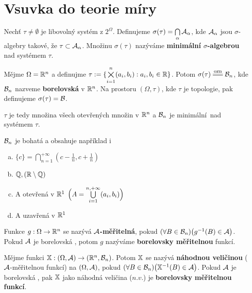 \chapter{Vsuvka do teorie míry}
\begin{define}
	Nechť $\tau\neq\emptyset $ je libovolný systém z $ 2^\Omega$. Definujeme $\sigma (\tau)= \bigcap\limits_{\alpha}\mathcal{A}_\alpha $, kde $\mathcal{A}_\alpha$ jsou $\sigma$-algebry takové, že $\tau \subset \mathcal{A}_\alpha$. Množinu $\sigma(\tau)$ nazýváme \textbf{minimální $\sigma$-algebrou} nad systémem $\tau$.
\end{define}
\begin{define}
	Mějme $\Omega=\mathbb{R}^n$ a definujme $\tau:=\{\bigtimes\limits_{i=1}^n(a_i,b_i):a_i,b_i\in\mathbb{R}\}$. Potom $\sigma(\tau)\equal{\text{ozn}}\Bb_n$, kde $\mathcal{B}_n$ nazveme \textbf{borelovská \salg} v $\mathbb{R}^n$. 
Na prostoru $(\Omega,\tau)$, kde $\tau$ je topologie, pak definujeme $\sigma(\tau)=\mathcal{B}$.
\end{define}
\begin{remark}
	 $\tau$ je tedy množina všech otevřených množin v $\mathbb{R}^n$ a $\mathcal{B}_n$ je minimální\newline \salg~nad systémem  $\tau$. 
\end{remark}
\begin{example}
	$\mathcal{B}_n$ je bohatá a obsahuje například i
	\begin{enumerate}[a)]
		\item $\{c\}=\bigcap\limits_{n=1}^{+\infty} (c-\frac{1}{n},c+\frac{1}{n}) $
		\item $\mathbb{Q}, (\mathbb{R}\setminus\mathbb{Q})$
		\item A otevřená v $\mathbb{R}^1$ $\Bigl(A=\bigcup\limits_{i=1}^{n,+\infty}(a_i,b_i)\Bigr)$
		\item A uzavřená v $\mathbb{R}^1$
	\end{enumerate}
\end{example}
\begin{define}
	Funkce $g:\Omega\to \mathbb{R}^n$ se nazývá \textbf{$\mathcal{A}$-měřitelná}, pokud $(\forall B \in \mathcal{B}_n)\bigl(g^{-1}(B) \in \mathcal{A}\bigr)$. Pokud $\mathcal{A}$ je borelovská \salg, potom $g$ nazýváme \textbf{borelovsky měřitelnou} funkcí.
\end{define}
\begin{define}
	Mějme funkci $\mathbb{X}:(\Omega,\mathcal{A})\to (\mathbb{R}^n,\mathcal{B}_n)$. Potom $\mathbb{X}$ se nazývá \textbf{náhodnou veličinou} ($\mathcal{A}$-měřitelnou funkcí) na $(\Omega,\mathcal{A})$, pokud $(\forall B \in \mathcal{B}_n)\bigl(\mathbb{X}^{-1}(B)\in \mathcal{A}\bigr)$. \newline
	Pokud $\mathcal{A}$ je borelovská \salg, pak $\mathbb{X}$ jako náhodná veličina ($n.v.$) je \textbf{borelovsky měřitelnou funkcí}.
\end{define}
